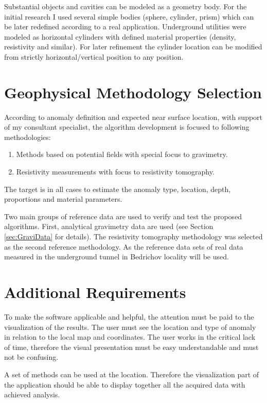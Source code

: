 \documentclass[FM]{tulthesis}
\begin{document}
Substantial objects and cavities can be modeled as a geometry body. For the initial research I used several simple bodies (sphere, cylinder, prism) which can be later redefined according to a real application. Underground utilities were modeled as horizontal cylinders with defined material properties (density, resistivity and similar). For later refinement the cylinder location can be modified from strictly horizontal/vertical position to any position.

\section{Geophysical Methodology Selection} \label{sec:MetodologySelection}
According to anomaly definition and expected near surface location, with support of my consultant specialist, the algorithm development is focused to following methodologies: 
\begin{enumerate}
\item Methods based on potential fields with special focus to gravimetry.
\item Resistivity measurements with focus to resistivity tomography.
\end{enumerate}

The target is in all cases to estimate the anomaly type, location, depth, proportions and material parameters. 

Two main groups of reference data are used to verify and test the proposed algorithms. First, analytical gravimetry data are used (see Section \ref{sec:GraviData} for details). The resistivity tomography methodology was selected as the second reference methodology. As the reference data sets of real data measured in the underground tunnel in Bedrichov locality will be used. 

\section{Additional Requirements} \label{sec:AdditionalRequiremenst}

To make the software applicable and helpful, the attention must be paid to the visualization of the results. The user must see the location and type of anomaly in relation to the local map and coordinates. The user works in the critical lack of time, therefore the visual presentation must be easy understandable and must not be confusing. 

A set of methods can be used at the location. Therefore the visualization part of the application should be able to display together all the acquired data with achieved analysis.
\end{document}
